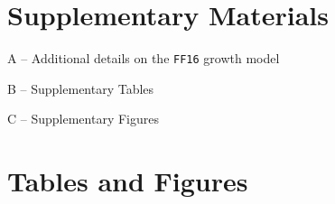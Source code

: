 \documentclass[a4paper,11pt]{article}
\begin{document}
\section{Supplementary Materials}

\noindent A -- Additional details on the \texttt{FF16} growth model

\noindent B -- Supplementary Tables

\noindent C -- Supplementary Figures

\vspace{10em}

\section{Tables and Figures}


\newpage
\end{document}
